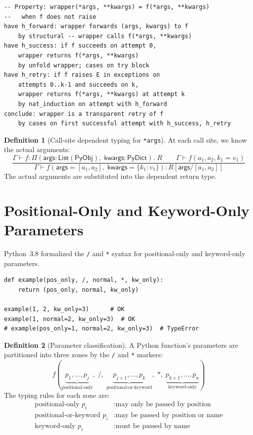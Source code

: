 \documentclass[11pt,a4paper]{report}
\theoremstyle{definition}
\newtheorem{definition}{Definition}[chapter]
\theoremstyle{plain}
\newcommand{\PyObj}{\mathsf{PyObj}}
\newcommand{\PyDict}{\mathsf{PyDict}}
\begin{document}
\begin{lstlisting}[style=proof]
-- Property: wrapper(*args, **kwargs) = f(*args, **kwargs)
--   when f does not raise
have h_forward: wrapper forwards (args, kwargs) to f
    by structural -- wrapper calls f(*args, **kwargs)
have h_success: if f succeeds on attempt 0,
    wrapper returns f(*args, **kwargs)
    by unfold wrapper; cases on try block
have h_retry: if f raises E in exceptions on
    attempts 0..k-1 and succeeds on k,
    wrapper returns f(*args, **kwargs) at attempt k
    by nat_induction on attempt with h_forward
conclude: wrapper is a transparent retry of f
    by cases on first successful attempt with h_success, h_retry
\end{lstlisting}

\begin{definition}[Call-site dependent typing for \texttt{*args}]
At each call site, we know the actual arguments:
\[
  \frac{
    \Gamma \vdash f : \Pi(\mathsf{args}: \mathsf{List}(\PyObj),\;
      \mathsf{kwargs}: \PyDict).\; R \qquad
    \Gamma \vdash f(a_1, a_2, k_1\!=\!v_1)
  }{
    \Gamma \vdash f(\mathsf{args}\!=\![a_1, a_2],\;
      \mathsf{kwargs}\!=\!\{k_1: v_1\}) : R[\mathsf{args}/[a_1,a_2]]
  }
\]
The actual arguments are substituted into the dependent return type.
\end{definition}

\section{Positional-Only and Keyword-Only Parameters}

Python~3.8 formalized the \texttt{/} and \texttt{*} syntax for
positional-only and keyword-only parameters.

\begin{lstlisting}[style=python]
def example(pos_only, /, normal, *, kw_only):
    return (pos_only, normal, kw_only)

example(1, 2, kw_only=3)      # OK
example(1, normal=2, kw_only=3)  # OK
# example(pos_only=1, normal=2, kw_only=3)  # TypeError
\end{lstlisting}

\begin{definition}[Parameter classification]
\label{def:param-class}
A Python function's parameters are partitioned into three zones by the
\texttt{/} and \texttt{*} markers:
\[
  f(
    \underbrace{p_1, \ldots, p_j}_{
      \text{positional-only}},\;
    /,\;
    \underbrace{p_{j+1}, \ldots, p_k}_{
      \text{positional-or-keyword}},\;
    *,\;
    \underbrace{p_{k+1}, \ldots, p_n}_{
      \text{keyword-only}}
  )
\]
The typing rules for each zone are:
\begin{align}
  \text{positional-only } p_i &: \text{may only be passed by position} \\
  \text{positional-or-keyword } p_i &: \text{may be passed by position or name} \\
  \text{keyword-only } p_i &: \text{must be passed by name}
\end{align}
\end{definition}
\end{document}
